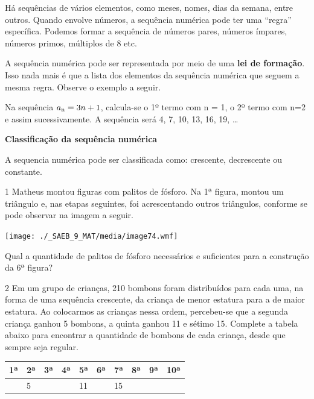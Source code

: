 {{{\begin{escolha}
{Há sequências de vários elementos, como meses, nomes, dias da
semana, entre outros. Quando envolve números, a sequência numérica pode
ter uma ``regra'' específica. Podemos formar a sequência de números
pares, números ímpares, números primos, múltiplos de 8 etc.

A sequência numérica pode ser representada por meio de uma \textbf{lei de
formação}. Isso nada mais é que a lista dos elementos da sequência
numérica que seguem a mesma regra. Observe o exemplo a seguir.

Na sequência $a\textsubscript{n}= 3n + 1$, calcula-se o 1º termo com n = 1,
o 2º termo com n=2 e assim sucessivamente. A sequência será 4, 7, 10, 13, 16, 19, \ldots{}

\textbf{Classificação da sequência numérica}

A sequencia numérica pode ser classificada como: crescente, decrescente
ou constante.}


\num{1} Matheus montou figuras com palitos de fósforo. Na 1ª figura, montou
um triângulo e, nas etapas seguintes, foi acrescentando outros triângulos,
conforme se pode observar na imagem a seguir.

\texttt{[image: ./\_SAEB\_9\_MAT/media/image74.wmf]}

Qual a quantidade de palitos de fósforo necessários e suficientes para a
construção da 6ª figura?



\num{2} Em um grupo de crianças, 210 bombons foram distribuídos
para cada uma, na forma de uma sequência crescente, da criança de menor
estatura para a de maior estatura. Ao colocarmos as crianças nessa
ordem, percebeu-se que a segunda criança ganhou 5 bombons, a quinta
ganhou 11 e sétimo 15. Complete a tabela abaixo para encontrar a
quantidade de bombons de cada criança, desde que sempre seja regular.

\begin{table}[]
\begin{tabular}{|l|l|l|l|l|l|l|l|l|l|}
\hline
\rowcolor[HTML]{CBCEFB} 
1ª & 2ª & 3ª & 4ª & 5ª & 6ª & 7ª & 8ª & 9ª & 10ª \\ \hline
 & 5 &  &  & 11 &  & 15 &  &  &  \\ \hline
\end{tabular}
\end{table}


\end{escolha}}}}
